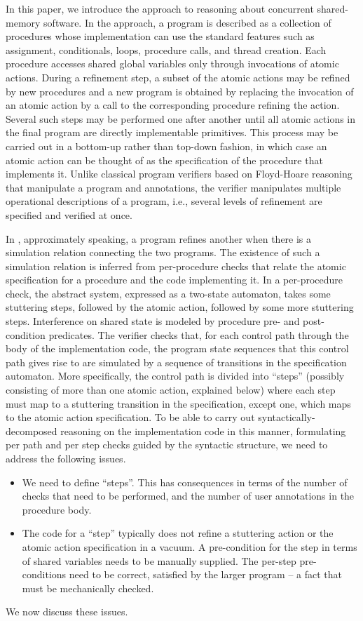In this paper, we introduce the \civl approach to reasoning about concurrent shared-memory software.
In the \civl approach, a program is described as a collection of procedures whose implementation 
can use the standard features such as assignment, conditionals, loops, procedure calls, and thread creation. 
Each procedure accesses shared global variables only through invocations of atomic actions.
During a refinement step, a subset of the atomic actions may be refined by new procedures and a new program is 
obtained by replacing the invocation of an atomic action by a call to the corresponding procedure refining the action.
Several such steps may be performed one after another until all atomic actions in the final program are directly implementable primitives.
This process may be carried out in a bottom-up rather than top-down fashion, in which case an atomic action 
can be thought of as the specification of the procedure that implements it.
Unlike classical program verifiers based on Floyd-Hoare reasoning that manipulate a program and annotations, 
the \civl verifier manipulates multiple operational descriptions of a program, i.e., several levels of refinement are specified and verified at once. 



In \civl, approximately speaking, a program refines another when there is a simulation relation connecting the two programs. 
The existence of such a simulation relation is inferred from per-procedure checks that relate the atomic specification for a procedure and the code implementing it. 
In a per-procedure check, the abstract system, expressed as a two-state automaton, takes some stuttering steps, followed by the atomic action, followed by some more stuttering steps. 
Interference on shared state is modeled by procedure pre- and post-condition predicates.
The verifier checks that, for each control path through the body of the implementation code, the program state sequences that this control path gives rise to are simulated by a sequence of transitions in the specification automaton. 
More specifically, the control path is divided into ``steps'' (possibly consisting of more than one atomic action, explained below) where each step must map to a stuttering transition in the specification, except one, which maps to the atomic action specification.
To be able to carry out syntactically-decomposed reasoning on the implementation code in this manner, formulating per path and per step checks guided by the syntactic structure, we need to address the following issues. 
\begin{itemize}
\item We need to define ``steps''. This has consequences in terms of the number of checks that need to be performed, and the number of user annotations in the procedure body.
\item The code for a ``step'' typically does not refine a stuttering action or the atomic action specification in a vacuum. A pre-condition for the step in terms of shared variables needs to be manually supplied. The per-step pre-conditions need to be correct, satisfied by the larger program -- a fact that must be mechanically checked. 
\end{itemize}
We now discuss these issues. 

